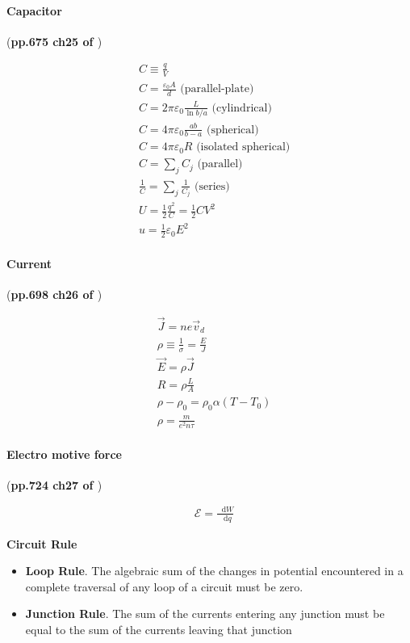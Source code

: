 \documentclass{article}
\newcommand*\diff{\mathop{}\!\mathrm{d}}
\numberwithin{equation}{subsection} %
\theoremstyle{definition}
\begin{document}
\paragraph{Capacitor} (\textbf{pp.675 ch25 of \cite{book}})

\begin{align}
    & C \equiv \frac{q}{V} \\
    & C = \frac{\varepsilon_0 A}{d} \text{ (parallel-plate)} \\
    & C = 2\pi \varepsilon_0 \frac{L}{\ln{b/a}} 
            \text{ (cylindrical)}\\
    & C = 4\pi \varepsilon_0 \frac{ab}{b-a} \text{ (spherical)}\\
    & C = 4\pi \varepsilon_0 R \text{ (isolated spherical)} \\
    & C = \sum_j C_j \text{ (parallel)} \\
    & \frac{1}{C} = \sum_j \frac{1}{C_j} \text{ (series)}  \\
    & U = \frac{1}{2}\frac{q^2}{C} = \frac{1}{2}CV^2 \\
    & u = \frac{1}{2}\varepsilon_0 E^2
\end{align}

\paragraph{Current} (\textbf{pp.698 ch26 of \cite{book}})

\begin{align}
    & \vec{J} = ne \vec{v}_d \\
    & \rho \equiv \frac{1}{\sigma} = \frac{E}{J} \\
    & \vec{E} = \rho \vec{J} \\
    & R = \rho \frac{L}{A} \\
    & \rho - \rho_0 = \rho_0 \alpha (T-T_0) \\
    & \rho = \frac{m}{e^2 n\tau }
\end{align}

\paragraph{Electro motive force} (\textbf{pp.724 ch27 of \cite{book}})

\begin{align}
    & \mathcal{E} = \frac{\diff W}{\diff q}
\end{align}

\textbf{Circuit Rule}
\begin{itemize}
    \item \textbf{Loop Rule}. The algebraic sum of the changes in
        potential encountered in a complete traversal of any loop of a
        circuit must be zero.
    \item \textbf{Junction Rule}. The sum of the currents entering any
        junction must be equal to the sum of the currents leaving that
        junction
\end{itemize}
\end{document}
